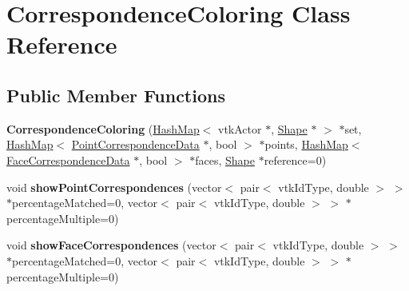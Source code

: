 \hypertarget{class_correspondence_coloring}{}\section{Correspondence\+Coloring Class Reference}
\label{class_correspondence_coloring}
\subsection*{Public Member Functions}
\begin{DoxyCompactItemize}
\item 
\hypertarget{class_correspondence_coloring_a1b933996e280406cc77f48c07e9c6dc7}{}{\bfseries Correspondence\+Coloring} (\hyperlink{class_hash_map}{Hash\+Map}$<$ vtk\+Actor $\ast$, \hyperlink{class_shape}{Shape} $\ast$ $>$ $\ast$set, \hyperlink{class_hash_map}{Hash\+Map}$<$ \hyperlink{class_point_correspondence_data}{Point\+Correspondence\+Data} $\ast$, bool $>$ $\ast$points, \hyperlink{class_hash_map}{Hash\+Map}$<$ \hyperlink{class_face_correspondence_data}{Face\+Correspondence\+Data} $\ast$, bool $>$ $\ast$faces, \hyperlink{class_shape}{Shape} $\ast$reference=0)\label{class_correspondence_coloring_a1b933996e280406cc77f48c07e9c6dc7}

\item 
\hypertarget{class_correspondence_coloring_a664467e021d1b49a693218ae56728537}{}void {\bfseries show\+Point\+Correspondences} (vector$<$ pair$<$ vtk\+Id\+Type, double $>$ $>$ $\ast$percentage\+Matched=0, vector$<$ pair$<$ vtk\+Id\+Type, double $>$ $>$ $\ast$percentage\+Multiple=0)\label{class_correspondence_coloring_a664467e021d1b49a693218ae56728537}

\item 
\hypertarget{class_correspondence_coloring_a01d90e7657d270d3420773f79ad6dbca}{}void {\bfseries show\+Face\+Correspondences} (vector$<$ pair$<$ vtk\+Id\+Type, double $>$ $>$ $\ast$percentage\+Matched=0, vector$<$ pair$<$ vtk\+Id\+Type, double $>$ $>$ $\ast$percentage\+Multiple=0)\label{class_correspondence_coloring_a01d90e7657d270d3420773f79ad6dbca}

\end{DoxyCompactItemize}
